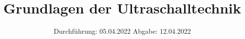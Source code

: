 

\subject{US1}
\title{Grundlagen der Ultraschalltechnik}
\date{%
  Durchführung: 05.04.2022
  \hspace{3em}
  Abgabe: 12.04.2022
}



\maketitle
\thispagestyle{empty}
\tableofcontents
\newpage






\printbibliography{}

\appendix
\newpage



